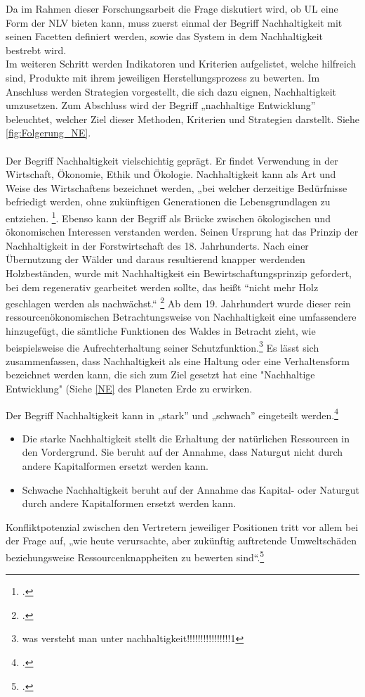 \documentclass{scrartcl}
\begin{document}
Da im Rahmen dieser Forschungsarbeit die Frage diskutiert wird, ob UL eine Form der NLV bieten kann, muss zuerst einmal der Begriff Nachhaltigkeit mit seinen Facetten definiert werden, sowie das System in dem Nachhaltigkeit bestrebt wird.\\
Im weiteren Schritt werden Indikatoren und Kriterien aufgelistet, welche hilfreich sind, Produkte mit ihrem jeweiligen Herstellungsprozess zu bewerten. Im Anschluss werden Strategien vorgestellt, die sich dazu eignen, Nachhaltigkeit umzusetzen.
Zum Abschluss wird der Begriff „nachhaltige Entwicklung” beleuchtet, welcher Ziel dieser Methoden, Kriterien und Strategien darstellt. Siehe \ref{fig:Folgerung_NE}.
\\
\\
Der Begriff Nachhaltigkeit vielschichtig geprägt. Er findet Verwendung in der Wirtschaft, Ökonomie, Ethik und Ökologie. Nachhaltigkeit kann als Art und Weise des Wirtschaftens bezeichnet werden, „bei welcher derzeitige Bedürfnisse befriedigt werden, ohne zukünftigen Generationen die Lebensgrundlagen zu entziehen. \footcite{DefinitionWirtschaftslexikonb}. Ebenso kann der Begriff als Brücke zwischen ökologischen und ökonomischen Interessen verstanden werden. Seinen Ursprung hat das Prinzip der Nachhaltigkeit in der Forstwirtschaft des 18. Jahrhunderts. Nach einer Übernutzung der Wälder und daraus resultierend knapper werdenden Holzbeständen, wurde mit Nachhaltigkeit ein Bewirtschaftungsprinzip gefordert, bei dem regenerativ gearbeitet werden sollte, das heißt “nicht mehr Holz geschlagen werden als nachwächst.“ \footcite{NachhaltigeBrockhaus.de}
Ab dem 19. Jahrhundert wurde dieser rein ressourcenökonomischen Betrachtungsweise von Nachhaltigkeit eine umfassendere hinzugefügt, die sämtliche Funktionen des Waldes in Betracht zieht, wie beispielsweise die Aufrechterhaltung seiner Schutzfunktion.\footnote{was versteht man unter nachhaltigkeit!!!!!!!!!!!!!!!!1}
Es lässt sich zusammenfassen, dass Nachhaltigkeit als eine Haltung oder eine Verhaltensform bezeichnet werden kann, die sich zum Ziel gesetzt hat eine "Nachhaltige Entwicklung" (Siehe \ref{NE} des Planeten Erde zu erwirken.

\hfill \break
Der Begriff Nachhaltigkeit kann in „stark” und „schwach” eingeteilt werden.\footcite{Nachhaltigkeit}
\begin{itemize}
\item Die starke Nachhaltigkeit stellt die Erhaltung der natürlichen Ressourcen in den Vordergrund. Sie beruht auf der Annahme, dass Naturgut nicht durch andere Kapitalformen ersetzt werden kann.
\item Schwache Nachhaltigkeit beruht auf der Annahme das Kapital- oder Naturgut durch andere Kapitalformen ersetzt werden kann.
\end{itemize}
Konfliktpotenzial zwischen den Vertretern jeweiliger Positionen tritt vor allem bei der Frage auf, „wie heute verursachte, aber zukünftig auftretende Umweltschäden beziehungsweise Ressourcenknappheiten zu bewerten sind“.\footcite{NachhaltigeBrockhaus.de}
\end{document}

